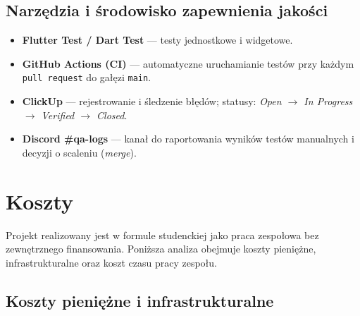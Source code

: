 \documentclass[11pt, a4paper]{article}
\begin{document}
\subsection{Narzędzia i środowisko zapewnienia jakości}

\begin{itemize}
  \item \textbf{Flutter Test / Dart Test} — testy jednostkowe i widgetowe.
  \item \textbf{GitHub Actions (CI)} — automatyczne uruchamianie testów przy każdym
        \texttt{pull request} do gałęzi \texttt{main}.
  \item \textbf{ClickUp} — rejestrowanie i śledzenie błędów; statusy:
        \textit{Open $\to$ In Progress $\to$ Verified $\to$ Closed}.
  \item \textbf{Discord \#qa-logs} — kanał do raportowania wyników testów manualnych
        i decyzji o scaleniu (\textit{merge}).
\end{itemize}

\section{Koszty}

Projekt realizowany jest w formule studenckiej jako praca zespołowa bez zewnętrznego
finansowania. Poniższa analiza obejmuje koszty pieniężne, infrastrukturalne
oraz koszt czasu pracy zespołu.

\subsection{Koszty pieniężne i infrastrukturalne}
\end{document}
